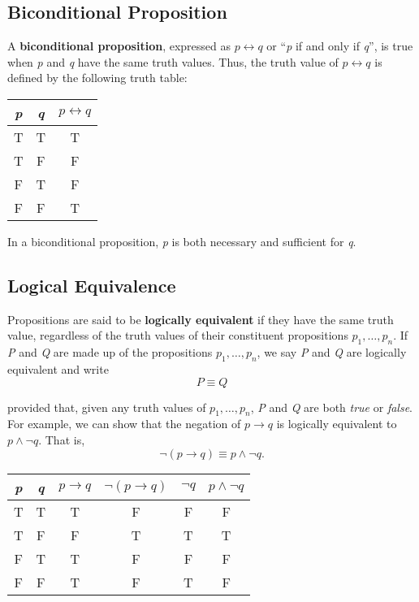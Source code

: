 \subsection*{Biconditional Proposition}

A \textbf{biconditional proposition}, expressed as $p \leftrightarrow q$ or ``\textit{p} if and only if \textit{q}'', is true when \textit{p} and \textit{q} have the same truth values.  Thus, the truth value of $p \leftrightarrow q$ is defined by the following truth table:

\begin{table}[h]
\centering
\begin{tabular}{|c|c|c|}
\hline
\textit{p} & \textit{q} & $p \leftrightarrow q$ \\ \hline
T          & T          & T       \\ \hline
T          & F          & F       \\ \hline
F          & T          & F       \\ \hline
F          & F          & T       \\ \hline
\end{tabular}
\end{table}

In a biconditional proposition, \textit{p} is both necessary and sufficient for \textit{q}.

\subsection*{Logical Equivalence}

Propositions are said to be \textbf{logically equivalent} if they have the same truth value, regardless of the truth values of their constituent propositions $p_1, \dots, p_n$.  If \textit{P} and \textit{Q} are made up of the propositions $p_1, \dots, p_n$, we say \textit{P} and \textit{Q} are logically equivalent and write
\[
    P \equiv Q
\]

provided that, given any truth values of $p_1, \dots, p_n$, \textit{P} and \textit{Q} are both \textit{true} or \textit{false}.\\

For example, we can show that the negation of $p \rightarrow q$ is logically equivalent to $p \land \lnot q$.  That is, 
\[
    \lnot (p \rightarrow q) \equiv p \land \lnot q.
\]

\begin{table}[h]
\centering
\begin{tabular}{|c|c|c|c|c|c|}
\hline
\textit{p} & \textit{q} & $p \rightarrow q$ & $\lnot (p \rightarrow q)$ & $\lnot q$ & $p \land \lnot q$ \\ \hline
T & T & T & F & F & F \\ \hline
T & F & F & T & T & T \\ \hline
F & T & T & F & F & F \\ \hline
F & F & T & F & T & F \\ \hline
\end{tabular}
\end{table}

